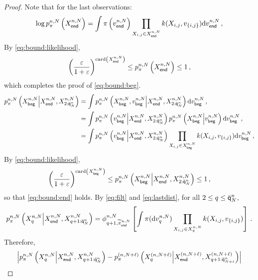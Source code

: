 \begin{proof}
Note that for the last observations:
\[
\log p_{\pi}^{n,N}\left(X_{\mathsf{end}}^{n,N}\right) = \int \pi\left(v_{\mathsf{end}}^{n,N}\right) \prod_{X_{i,j}\in X_{\mathsf{end}}^{n,N}}k(X_{i,j},v_{\{i,j\}})\mathrm{d} v_{\mathsf{end}}^{n,N}\,,
\]
By \eqref{eq:bound:likelihood},
\[
 \left(\frac{\varepsilon}{1+\varepsilon}\right)^{\mathrm{card}\left(X_{\mathsf{end}}^{n,N}\right)}\le p_{\pi}^{n,N}\left(X_{\mathsf{end}}^{n,N}\right)  \le 1\,,
\]
which completes the proof of \eqref{eq:bound:beg}.
\begin{align*}
p_{\pi}^{n,N}\left(X_{\mathsf{beg}}^{n,N}\middle|X_{\mathsf{end}}^{n,N},X_{2:\bar{\mathsf{q}}^{n}_{N}}^{n,N}\right) &= \int p_{\pi}^{n,N}\left(X_{\mathsf{beg}}^{n,N},v_{\mathsf{beg}}^{n,N}\middle|X_{\mathsf{end}}^{n,N},X_{2:\bar{\mathsf{q}}^{n}_{N}}^{n,N}\right)\mathrm{d} v_{\mathsf{beg}}^{n,N}\,,\\
&=\int p_{\pi}^{n,N}\left(v_{\mathsf{beg}}^{n,N}\middle|X_{\mathsf{end}}^{n,N},X_{2:\bar{\mathsf{q}}^{n}_{N}}^{n,N}\right) p_{\pi}^{n,N}\left(X_{\mathsf{beg}}^{n,N}\middle|v_{\mathsf{beg}}^{n,N}\right)\mathrm{d} v_{\mathsf{beg}}^{n,N}\,,\\
&=\int p_{\pi}^{n,N}\left(v_{\mathsf{beg}}^{n,N}\middle|X_{\mathsf{end}}^{n,N},X_{2:\bar{\mathsf{q}}^{n}_{N}}^{n,N}\right) \prod_{X_{i,j}\in X_{\mathsf{beg}}^{n,N}}k(X_{i,j},v_{\{i,j\}})\mathrm{d} v_{\mathsf{beg}}^{n,N}\,,\\
\end{align*}
By \eqref{eq:bound:likelihood},
\[
 \left(\frac{\varepsilon}{1+\varepsilon}\right)^{\mathrm{card}\left(X_{\mathsf{beg}}^{n,N}\right)}\le p_{\pi}^{n,N}\left(X_{\mathsf{beg}}^{n,N}\middle|X_{\mathsf{end}}^{n,N},X_{2:\bar{\mathsf{q}}^{n}_{N}}^{n,N}\right) \le 1\,,
\]
so that \eqref{eq:bound:end} holds. By \eqref{eq:filt} and \eqref{eq:lastdist}, for all $2\le q\le \bar{\mathsf{q}}^{n}_{N}$,
\begin{equation}
\label{eq:incremental:lik}
p_{\pi}^{n,N}\left(X_{q}^{n,N}\middle|X_{\mathsf{end}}^{n,N},X_{q+1:\bar{\mathsf{q}}^{n}_{N}}^{n,N}\right) = \phi^{n,N}_{q+1,\widetilde{\pi}^{n,N}_\mathsf{end}}\left[\int\pi(\mathrm{d} v^{n,N}_q)\prod_{X_{i,j}\in X_{q}^{n,N}}k(X_{i,j},v_{\{i,j\}})\right]\,.
\end{equation}
Therefore,
\begin{multline*}
\left|p_{\pi}^{n,N}\left(X_{q}^{n,N}\middle|X_{\mathsf{end}}^{n,N},X_{q+1:\ordermax{n}{N}}^{n,N}\right) - p_{\pi}^{(n,N+\ell)}\left(X_{q}^{(n,N+\ell)}\middle|X_{\mathsf{end}}^{(n,N+\ell)},X_{q+1:\ordermax{n}{N+\ell}}^{(n,N+\ell)}\right) \right|\\

\end{multline*}
\end{proof}
